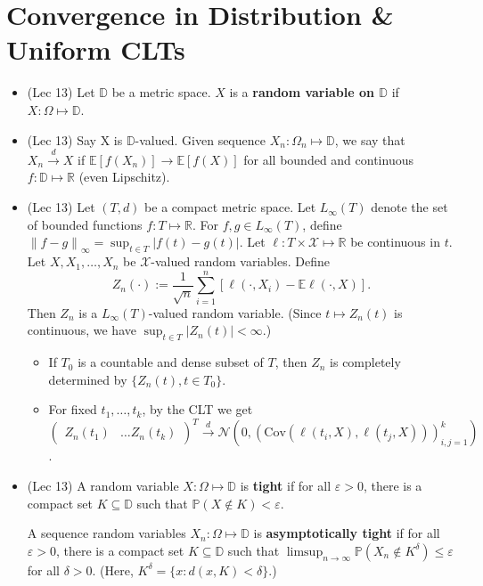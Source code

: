 \documentclass[twoside]{article}
\newcommand{\dis}{\displaystyle}
\newcommand{\norm}[1]{\left\|{#1}\right\|} %
\newcommand\bbD{\mathbb{D}}
\newcommand\bbE{\mathbb{E}}
\newcommand\bbP{\mathbb{P}}
\newcommand\bbR{\mathbb{R}}
\newcommand\calN{\mathcal{N}}
\newcommand\calX{\mathcal{X}}
\newcommand\dlt{\delta}
\def\eps{\varepsilon}
\newcommand\Om{\Omega}
\newcommand\cd{\stackrel{d}{\goesto}}
\newcommand\goesto{\rightarrow}
\begin{document}
\section{Convergence in Distribution \& Uniform CLTs}
\begin{itemize}
\item (Lec 13) Let $\bbD$ be a metric space. $X$ is a \textbf{random variable on $\bbD$} if $X:\Om \mapsto \bbD$.

\item (Lec 13) Say X is $\bbD$-valued. Given sequence $X_n: \Om_n \mapsto \bbD$, we say that $X_n \cd X$ if $\bbE[f(X_n)] \goesto \bbE[f(X)]$ for all bounded and continuous $f: \bbD \mapsto \bbR$ (even Lipschitz).

\item (Lec 13) Let $(T,d)$ be a compact metric space. Let $L_{\infty}(T)$ denote the set of bounded functions $f: T \mapsto \bbR$. For $f, g \in L_{\infty}(T)$, define $\norm{f-g}_{\infty} = \dis\sup_{t\in T}|f(t)-g(t)|$. Let $\ell: T\times \calX \mapsto \bbR$ be continuous in $t$. Let $X, X_1, \dots, X_n$ be $\calX$-valued random variables. Define
\[
Z_n(\cdot) := \frac{1}{\sqrt{n}} \sum^n_{i=1}[\ell(\cdot,X_i)-\bbE \ell(\cdot,X)].\]
Then $Z_n$ is a $L_{\infty}(T)$-valued random variable. (Since $t \mapsto Z_n(t)$ is continuous, we have $\dis\sup_{t\in T}|Z_n(t)|<\infty$.)
\begin{itemize}
\item If $T_0$ is a countable and dense subset of $T$, then $Z_n$ is completely determined by $\{ Z_n(t), t \in T_0\}$.

\item For fixed $t_1, \dots, t_k$, by the CLT we get $\begin{pmatrix} Z_n(t_1) & \dots Z_n(t_k) \end{pmatrix}^T \cd \calN \left( 0, (\text{Cov} (\ell(t_i, X), \ell(t_j, X) ) )_{i,j = 1}^k \right)$.
\end{itemize}

\item (Lec 13) A random variable $X: \Om \mapsto \bbD$ is \textbf{tight} if for all $\eps > 0$, there is a compact set $K \subseteq \bbD$ such that $\bbP (X \notin K) < \eps$.


A sequence random variables $X_n: \Om \mapsto \bbD$ is \textbf{asymptotically tight} if for all $\eps > 0$, there is a compact set $K \subseteq \bbD$ such that $\dis\limsup_{n \goesto \infty} \bbP (X_n \notin K^\dlt) \leq \eps$ for all $\dlt > 0$. (Here, $K^\dlt = \{ x: d(x, K) < \dlt\}$.)


\end{itemize}
\end{document}
